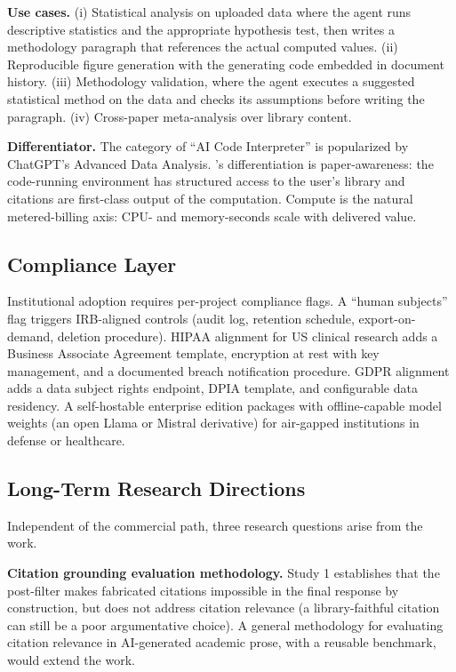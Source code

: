 \textbf{Use cases.} (i) Statistical analysis on uploaded data where the agent runs descriptive statistics and the appropriate hypothesis test, then writes a methodology paragraph that references the actual computed values. (ii) Reproducible figure generation with the generating code embedded in document history. (iii) Methodology validation, where the agent executes a suggested statistical method on the data and checks its assumptions before writing the paragraph. (iv) Cross-paper meta-analysis over library content.

\textbf{Differentiator.} The category of ``AI Code Interpreter'' is popularized by ChatGPT's Advanced Data Analysis. \sh{}'s differentiation is paper-awareness: the code-running environment has structured access to the user's library and citations are first-class output of the computation. Compute is the natural metered-billing axis: CPU- and memory-seconds scale with delivered value.

\subsection{Compliance Layer}
\label{sec:fw-compliance}

Institutional adoption requires per-project compliance flags. A ``human subjects'' flag triggers IRB-aligned controls (audit log, retention schedule, export-on-demand, deletion procedure). HIPAA alignment for US clinical research adds a Business Associate Agreement template, encryption at rest with key management, and a documented breach notification procedure. GDPR alignment adds a data subject rights endpoint, DPIA template, and configurable data residency. A self-hostable enterprise edition packages \sh{} with offline-capable model weights (an open Llama or Mistral derivative) for air-gapped institutions in defense or healthcare.

\subsection{Long-Term Research Directions}
\label{sec:fw-research}

Independent of the commercial path, three research questions arise from the work.

\textbf{Citation grounding evaluation methodology.} Study 1 establishes that the post-filter makes fabricated citations impossible in the final response by construction, but does not address citation relevance (a library-faithful citation can still be a poor argumentative choice). A general methodology for evaluating citation relevance in AI-generated academic prose, with a reusable benchmark, would extend the work.

